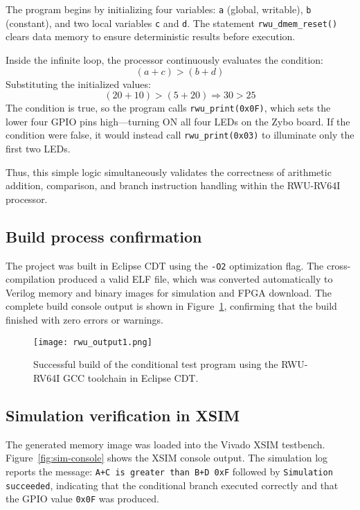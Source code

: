 \noindent
The program begins by initializing four variables:  
\texttt{a} (global, writable), \texttt{b} (constant), and two local variables \texttt{c} and \texttt{d}.  
The statement \texttt{rwu\_dmem\_reset()} clears data memory to ensure deterministic results before execution.

Inside the infinite loop, the processor continuously evaluates the condition:
\[
(a + c) > (b + d)
\]
Substituting the initialized values:
\[
(20 + 10) > (5 + 20) \Rightarrow 30 > 25
\]
The condition is true, so the program calls \texttt{rwu\_print(0x0F)}, which sets the lower four GPIO pins high—turning ON all four LEDs on the Zybo board.  
If the condition were false, it would instead call \texttt{rwu\_print(0x03)} to illuminate only the first two LEDs.

Thus, this simple logic simultaneously validates the correctness of arithmetic addition, comparison, and branch instruction handling within the RWU-RV64I processor.

\subsection{Build process confirmation}
The project was built in Eclipse CDT using the \texttt{-O2} optimization flag.  
The cross-compilation produced a valid ELF file, which was converted automatically to Verilog memory and binary images for simulation and FPGA download.  
The complete build console output is shown in Figure~\ref{fig:build-console}, confirming that the build finished with zero errors or warnings.

\begin{figure}[H]
  \centering
  \texttt{[image: rwu\_output1.png]}
  \caption{Successful build of the conditional test program using the RWU-RV64I GCC toolchain in Eclipse CDT.}
  \label{fig:build-console}
\end{figure}

\subsection{Simulation verification in XSIM}
The generated memory image was loaded into the Vivado XSIM testbench.  
Figure~\ref{fig:sim-console} shows the XSIM console output.  
The simulation log reports the message:
\texttt{A+C is greater than B+D 0xF} followed by \texttt{Simulation succeeded}, indicating that the conditional branch executed correctly and that the GPIO value \texttt{0x0F} was produced.


